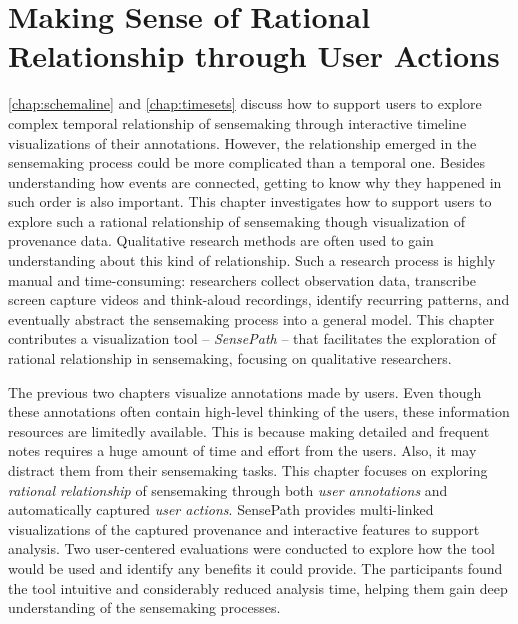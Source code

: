 \chapter{Making Sense of Rational Relationship through User Actions}
\label{chap:sensepath}

\graphicspath{{Chapter5/figures/}}



\autoref{chap:schemaline} and \autoref{chap:timesets} discuss how to support users to explore complex temporal relationship of sensemaking through interactive timeline visualizations of their annotations. However, the relationship emerged in the sensemaking process could be more complicated than a temporal one. Besides understanding how events are connected, getting to know why they happened in such order is also important. This chapter investigates how to support users to explore such a rational relationship of sensemaking though visualization of provenance data. Qualitative research methods are often used to gain understanding about this kind of relationship. Such a research process is highly manual and time-consuming: researchers collect observation data, transcribe screen capture videos and think-aloud recordings, identify recurring patterns, and eventually abstract the sensemaking process into a general model. This chapter contributes a visualization tool -- \emph{SensePath} -- that facilitates the exploration of rational relationship in sensemaking, focusing on qualitative researchers.

The previous two chapters visualize annotations made by users. Even though these annotations often contain high-level thinking of the users, these information resources are limitedly available. This is because making detailed and frequent notes requires a huge amount of time and effort from the users. Also, it may distract them from their sensemaking tasks. This chapter focuses on exploring \emph{rational relationship} of sensemaking through both \emph{user annotations} and automatically captured \emph{user actions}. SensePath provides multi-linked visualizations of the captured provenance and interactive features to support analysis. Two user-centered evaluations were conducted to explore how the tool would be used and identify any benefits it could provide. The participants found the tool intuitive and considerably reduced analysis time, helping them gain deep understanding of the sensemaking processes.






